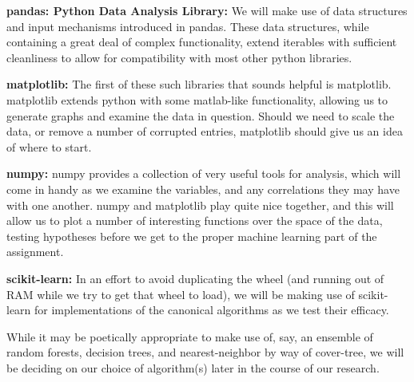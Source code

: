 \documentclass{article}
\begin{document}
\textbf{pandas: Python Data Analysis Library:}
We will make use of data structures and input mechanisms introduced in 
pandas.  These data structures, while containing a great deal of 
complex functionality, extend iterables with sufficient cleanliness to 
allow for compatibility with most other python libraries.

\textbf{matplotlib:} 
The first of these such libraries that sounds helpful is matplotlib.  
matplotlib extends python with some matlab-like functionality, allowing 
us to generate graphs and examine the data in question.  Should we need 
to scale the data, or remove a number of corrupted entries, matplotlib 
should give us an idea of where to start.

\textbf{numpy:}
numpy provides a collection of very useful tools for analysis, which 
will come in handy as we examine the variables, and any correlations 
they may have with one another.  numpy and matplotlib play quite nice 
together, and this will allow us to plot a number of interesting 
functions over the space of the data, testing hypotheses before we get 
to the proper machine learning part of the assignment.

\textbf{scikit-learn:}
In an effort to avoid duplicating the wheel (and running out of RAM 
while we try to get that wheel to load), we will be making use of 
scikit-learn for implementations of the canonical algorithms as we test 
their efficacy.

While it may be poetically appropriate to make use of, say, an ensemble 
of random forests, decision trees, and nearest-neighbor by way of 
cover-tree, we will be deciding on our choice of algorithm(s) later in 
the course of our research.  
\end{document}

